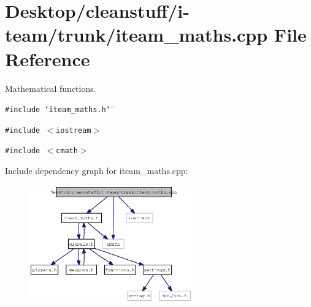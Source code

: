 \section{Desktop/cleanstuff/i-team/trunk/iteam\_\-maths.cpp File Reference}
\label{iteam__maths_8cpp}
Mathematical functions. 

{\tt \#include \char`\"{}iteam\_\-maths.h\char`\"{}}\par
{\tt \#include $<$iostream$>$}\par
{\tt \#include $<$cmath$>$}\par


Include dependency graph for iteam\_\-maths.cpp:\nopagebreak
\begin{figure}[H]
\begin{center}
\leavevmode
\includegraphics[width=199pt]{iteam__maths_8cpp__incl}
\end{center}
\end{figure}
